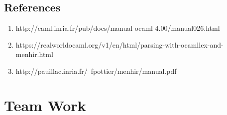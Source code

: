 \documentclass{article}
\begin{document}
\subsection*{References}
\begin{enumerate}
  \item http://caml.inria.fr/pub/docs/manual-ocaml-4.00/manual026.html
  \item https://realworldocaml.org/v1/en/html/parsing-with-ocamllex-and-menhir.html
  \item http://pauillac.inria.fr/~fpottier/menhir/manual.pdf
\end{enumerate}

\section*{Team Work}
\end{document}
